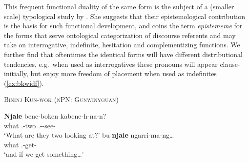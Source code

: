 \documentclass[12pt,egregdoesnotlikesansseriftitles]{scrartcl}
\begin{document}
This frequent functional duality of the same form is the subject of a (smaller scale) typological study by \citet{mushin95}. She suggests that their epistemological contribution is the basis for such functional development, and coins the term \textit{epistememe} for the forms that serve ontological categorization of discourse referents and may take on interrogative, indefinite, hesitation and complementizing functions. We further find that oftentimes the identical forms will have different distributional tendencies, e.g.\ when used as interrogatives these pronouns will appear clause-initially, but enjoy more freedom of placement when used as indefinites (\ref{ex:bkwidf}).
\begin{exe}
  \ex\label{ex:bkwidf} \textsc{Bininj Kun-wok (nPN: Gunwinyguan)}\hfill {}\\
  \begin{xlist}
    \ex\gll \textbf{Njale} bene-boken kabene-h-na-n?\\
    what \Third.\Ua-two \Third.\Ua-\Imm-see-\Np\\
    `What are they two looking at?' %
    \ex\gll bu \textbf{njale} ngarri-ma-ng\ldots\\
    \Sub{} what \First.\Aug-get-\Np\\
    `and if we get something\ldots' %
  \end{xlist}
\end{exe}
\end{document}
